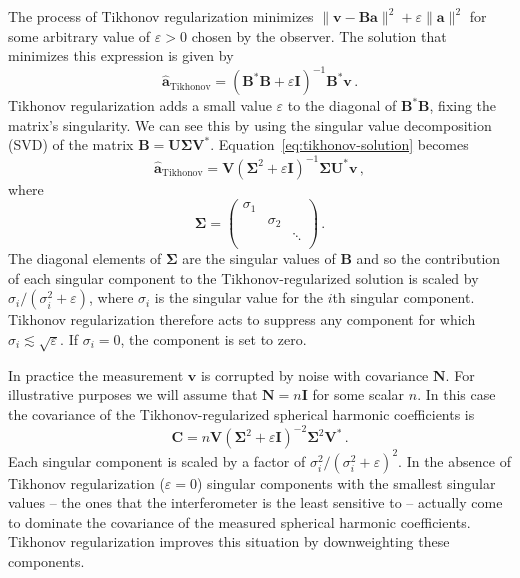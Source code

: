 \documentclass[twocolumn]{aastex61}
\renewcommand{\b}{\pmb}
\newcommand{\atikh}{\b{\hat a}_\text{Tikhonov}}
\begin{document}
The process of Tikhonov regularization minimizes $\|\b v - \b B\b a\|^2 + \varepsilon\|\b a\|^2$ for
some arbitrary value of $\varepsilon > 0$ chosen by the observer. The solution that minimizes this
expression is given by
\begin{equation}\label{eq:tikhonov-solution}
    \atikh = (\b B^*\b B + \varepsilon\b I)^{-1}\b B^*\b v\,.
\end{equation}
Tikhonov regularization adds a small value $\varepsilon$ to the diagonal of $\b B^*\b B$, fixing the
matrix's singularity. We can see this by using the singular value decomposition (SVD) of the matrix
$\b B = \b U \b \Sigma \b V^*$. Equation~\ref{eq:tikhonov-solution} becomes
\begin{equation}
    \atikh = \b V (\b\Sigma^2 + \varepsilon \b I)^{-1}\b\Sigma \b U^*\b v\,,
\end{equation}
where
\[
    \b\Sigma = \left(
        \begin{array}{ccc}
            \sigma_1 & & \\
                     & \sigma_2 & \\
                     & & \ddots \\
        \end{array}
    \right)\,.
\]
The diagonal elements of $\b\Sigma$ are the singular values of $\b B$ and so the contribution of
each singular component to the Tikhonov-regularized solution is scaled by $\sigma_i / (\sigma_i^2 +
\varepsilon)$, where $\sigma_i$ is the singular value for the $i$th singular component. Tikhonov
regularization therefore acts to suppress any component for which
$\sigma_i\lesssim\sqrt{\varepsilon}$.  If $\sigma_i = 0$, the component is set to zero.

In practice the measurement $\b v$ is corrupted by noise with covariance $\b N$. For illustrative
purposes we will assume that $\b N=n\b I$ for some scalar $n$. In this case the covariance of the
Tikhonov-regularized spherical harmonic coefficients is
\begin{equation}
    \b C = n \b V (\b\Sigma^2 + \varepsilon\b I)^{-2} \b\Sigma^2 \b V^*\,.
\end{equation}
Each singular component is scaled by a factor of $\sigma_i^2/(\sigma_i^2 + \varepsilon)^2$.  In the
absence of Tikhonov regularization ($\varepsilon=0$) singular components with the smallest singular
values -- the ones that the interferometer is the least sensitive to -- actually come to dominate
the covariance of the measured spherical harmonic coefficients. Tikhonov regularization improves
this situation by downweighting these components.
\end{document}

